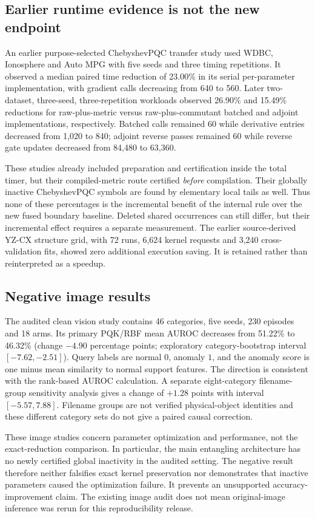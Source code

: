 \subsection{Earlier runtime evidence is not the new endpoint}
An earlier purpose-selected ChebyshevPQC transfer study used WDBC,
Ionosphere and Auto MPG with five seeds and three timing repetitions.
It observed a median paired time reduction of 23.00\% in its serial
per-parameter implementation, with gradient calls decreasing from
640 to 560. Later two-dataset, three-seed, three-repetition workloads
observed 26.90\% and 15.49\% reductions for raw-plus-metric versus
raw-plus-commutant batched and adjoint implementations, respectively.
Batched calls remained 60 while derivative entries decreased from
1,020 to 840; adjoint reverse passes remained 60 while reverse gate
updates decreased from 84,480 to 63,360.

These studies already included preparation and certification inside
the total timer, but their compiled-metric route certified \emph{before}
compilation. Their globally inactive ChebyshevPQC symbols are found
by elementary local tails as well. Thus none of these percentages is
the incremental benefit of the internal rule over the new fused
boundary baseline. Deleted shared occurrences can still differ, but
their incremental effect requires a separate measurement. The earlier
source-derived YZ-CX structure grid, with 72 runs, 6,624 kernel requests
and 3,240 cross-validation fits, showed zero additional execution
saving. It is retained rather than reinterpreted as a speedup.

\subsection{Negative image results}
The audited clean vision study contains 46 categories, five seeds,
230 episodes and 18 arms. Its primary PQK/RBF mean AUROC decreases
from 51.22\% to 46.32\% (change $-4.90$ percentage points;
exploratory category-bootstrap interval $[-7.62,-2.51]$). Query
labels are normal $0$, anomaly $1$, and the anomaly score is one
minus mean similarity to normal support features. The direction is
consistent with the rank-based AUROC calculation. A separate
eight-category filename-group sensitivity analysis gives a change of
$+1.28$ points with interval $[-5.57,7.88]$. Filename groups are
not verified physical-object identities and these different category
sets do not give a paired causal correction.

These image studies concern parameter optimization and performance,
not the exact-reduction comparison. In particular, the main entangling
architecture has no newly certified global inactivity in the audited
setting. The negative result therefore neither falsifies exact kernel
preservation nor demonstrates that inactive parameters caused the
optimization failure. It prevents an unsupported accuracy-improvement
claim. The existing image audit does not mean original-image inference
was rerun for this reproducibility release.

